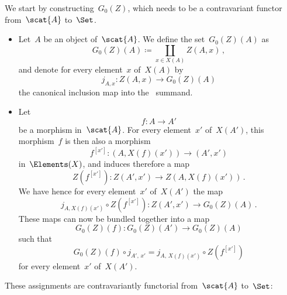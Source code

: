 We start by constructing~$G_0(Z)$, which needs to be a contravariant functor from~$\scat{A}$ to~$\Set$.
\begin{itemize}

	\item
		Let~$A$ be an object of~$\scat{A}$.
		We define the set~$G_0(Z)(A)$ as
		\[
			G_0(Z)(A) ≔ ∐_{x ∈ X(A)} Z(A, x) \,,
		\]
		and denote for every element~$x$ of~$X(A)$ by
		\[
			j_{A, x} \colon Z(A, x) \to G_0(Z)(A)
		\]
		the canonical inclusion map into the~ summand.

	\item
		Let
		\[
			f \colon A \to A'
		\]
		be a morphism in~$\scat{A}$.
		For every element~$x'$ of~$X(A')$, this morphism~$f$ is then also a morphism
		\[
			f^{[x']} \colon ( A, X(f)(x') ) \to ( A', x' )
		\]
		in~$\Elements(X)$, and induces therefore a map
		\[
			Z(f^{[x']}) \colon Z(A', x') \to Z(A, X(f)(x')) \,.
		\]
		We have hence for every element~$x'$ of~$X(A')$ the map
		\[
			j_{A, X(f)(x')} \circ Z(f^{[x']})
			\colon
			Z(A', x')
			\to
			G_0(Z)(A) \,.
		\]
		These maps can now be bundled together into a map
		\[
			G_0(Z)(f) \colon G_0(Z)(A') \to G_0(Z)(A)
		\]
		such that
		\[
			G_0(Z)(f) ∘ j_{A',\, x'} = j_{A,\, X(f)(x')} ∘ Z(f^{[x']})
		\]
		for every element~$x'$ of~$X(A')$.

\end{itemize}
These assignments are contravariantly functorial from~$\scat{A}$ to~$\Set$:
